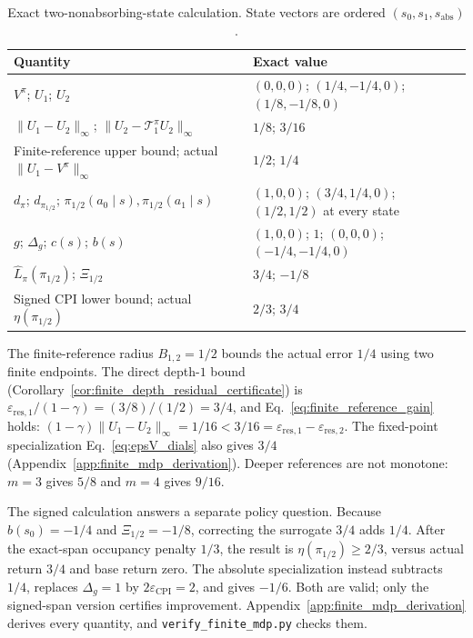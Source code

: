 \documentclass{article}
\theoremstyle{plain}
\theoremstyle{definition}
\theoremstyle{remark}
\begin{document}
\begin{table}[htbp]
\caption{Exact two-nonabsorbing-state calculation. State vectors are ordered
$(s_0,s_1,s_{\mathrm{abs}})$.}
\label{tab:finite_mdp_summary}
\centering
\small
\setlength{\tabcolsep}{5pt}
\begin{tabularx}{\linewidth}{@{}lX@{}}
\toprule
Quantity & Exact value \\
\midrule
$V^\pi$; $U_1$; $U_2$ & $(0,0,0)$; $(1/4,-1/4,0)$; $(1/8,-1/8,0)$ \\
$\|U_1-U_2\|_\infty$; $\|U_2-\mathcal T_1^\pi U_2\|_\infty$
& $1/8$; $3/16$ \\
Finite-reference upper bound; actual $\|U_1-V^\pi\|_\infty$
& $1/2$; $1/4$ \\
$d_\pi$; $d_{\pi_{1/2}}$; $\pi_{1/2}(a_0\mid s),\pi_{1/2}(a_1\mid s)$
& $(1,0,0)$; $(3/4,1/4,0)$; $(1/2,1/2)$ at every state \\
$g$; $\Delta_g$; $c(s)$; $b(s)$
& $(1,0,0)$; $1$; $(0,0,0)$; $(-1/4,-1/4,0)$ \\
$\widehat L_\pi(\pi_{1/2})$; $\Xi_{1/2}$
& $3/4$; $-1/8$ \\
Signed CPI lower bound; actual $\eta(\pi_{1/2})$
& $2/3$; $3/4$ \\
\bottomrule
\end{tabularx}
\end{table}

The finite-reference radius $B_{1,2}=1/2$ bounds the actual error $1/4$
using two finite endpoints. The direct depth-$1$ bound
(Corollary~\ref{cor:finite_depth_residual_certificate}) is
$\varepsilon_{\mathrm{res},1}/(1-\gamma)=(3/8)/(1/2)=3/4$, and
Eq.~\eqref{eq:finite_reference_gain} holds:
$(1-\gamma)\|U_1-U_2\|_\infty=1/16<3/16
=\varepsilon_{\mathrm{res},1}-\varepsilon_{\mathrm{res},2}$.
The fixed-point specialization Eq.~\eqref{eq:epsV_dials} also gives $3/4$
(Appendix~\ref{app:finite_mdp_derivation}).
Deeper references are not monotone: $m=3$ gives $5/8$ and $m=4$ gives $9/16$.

The signed calculation answers a separate policy question. Because
$b(s_0)=-1/4$ and $\Xi_{1/2}=-1/8$, correcting the surrogate $3/4$ adds
$1/4$. After the exact-span occupancy penalty $1/3$, the result is
$\eta(\pi_{1/2})\ge2/3$, versus actual return $3/4$ and base return zero.
The absolute specialization instead subtracts $1/4$, replaces
$\Delta_g=1$ by $2\varepsilon_{\mathrm{CPI}}=2$, and gives $-1/6$. Both are
valid; only the signed-span version certifies improvement. Appendix~\ref{app:finite_mdp_derivation}
derives every quantity, and \texttt{verify\_finite\_mdp.py} checks them.
\end{document}
